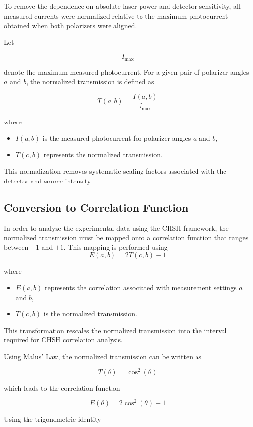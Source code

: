 \documentclass[17pt,a4paper]{extarticle}
\begin{document}
To remove the dependence on absolute laser power and detector sensitivity, all measured currents were normalized relative to the maximum photocurrent obtained when both polarizers were aligned.

Let

\[
I_{\text{max}}
\]

denote the maximum measured photocurrent. For a given pair of polarizer angles $a$ and $b$, the normalized transmission is defined as

\[
T(a,b) = \frac{I(a,b)}{I_{\text{max}}}
\]

where

\begin{itemize}
\item $I(a,b)$ is the measured photocurrent for polarizer angles $a$ and $b$,
\item $T(a,b)$ represents the normalized transmission.
\end{itemize}

This normalization removes systematic scaling factors associated with the detector and source intensity.

\subsection{Conversion to Correlation Function}

In order to analyze the experimental data using the CHSH framework, the normalized transmission must be mapped onto a correlation function that ranges between $-1$ and $+1$. This mapping is performed using
\[
E(a,b) = 2T(a,b) - 1
\]

where

\begin{itemize}
\item $E(a,b)$ represents the correlation associated with measurement settings $a$ and $b$,
\item $T(a,b)$ is the normalized transmission.
\end{itemize}

This transformation rescales the normalized transmission into the interval required for CHSH correlation analysis.

Using Malus' Law, the normalized transmission can be written as

\[
T(\theta) = \cos^2(\theta)
\]

which leads to the correlation function

\[
E(\theta) = 2\cos^2(\theta) - 1
\]

Using the trigonometric identity
\end{document}
